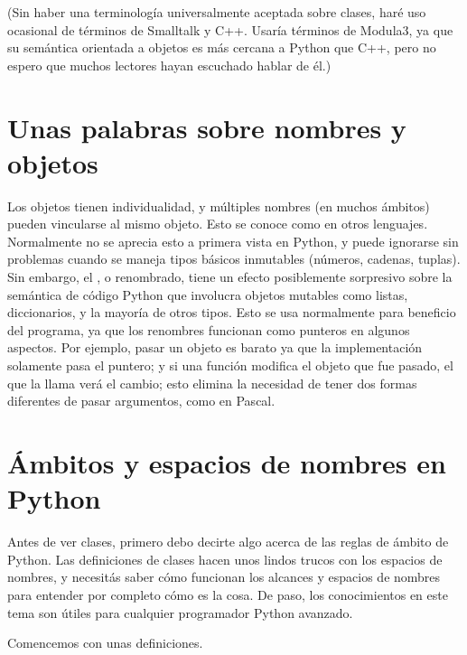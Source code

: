 \documentclass[a5paper,10pt,spanish]{sphinxmanual}
\begin{document}
\sphinxAtStartPar
(Sin haber una terminología universalmente aceptada sobre clases, haré uso ocasional de términos de Smalltalk y C++.  Usaría términos de Modula\sphinxhyphen{}3, ya que su semántica orientada a objetos es más cercana a Python que C++, pero no espero que muchos lectores hayan escuchado hablar de él.)


\section{Unas palabras sobre nombres y objetos}
\label{\detokenize{tutorial/classes:a-word-about-names-and-objects}}\label{\detokenize{tutorial/classes:tut-object}}
\sphinxAtStartPar
Los objetos tienen individualidad, y múltiples nombres (en muchos ámbitos) pueden vincularse al mismo objeto.  Esto se conoce como  en otros lenguajes.  Normalmente no se aprecia esto a primera vista en Python, y puede ignorarse sin problemas cuando se maneja tipos básicos inmutables (números, cadenas, tuplas).  Sin embargo, el , o renombrado,  tiene un efecto posiblemente sorpresivo sobre la semántica de código Python que involucra objetos mutables como listas, diccionarios, y la mayoría de otros tipos.  Esto se usa normalmente para beneficio del programa, ya que los renombres funcionan como punteros en algunos aspectos.  Por ejemplo, pasar un objeto es barato ya que la implementación solamente pasa el puntero; y si una función modifica el objeto que fue pasado, el que la llama verá el cambio; esto elimina la necesidad de tener dos formas diferentes de pasar argumentos, como en Pascal.


\section{Ámbitos y espacios de nombres en Python}
\label{\detokenize{tutorial/classes:python-scopes-and-namespaces}}\label{\detokenize{tutorial/classes:tut-scopes}}
\sphinxAtStartPar
Antes de ver clases, primero debo decirte algo acerca de las reglas de ámbito de Python.  Las definiciones de clases hacen unos lindos trucos con los espacios de nombres, y necesitás saber cómo funcionan los alcances y espacios de nombres para entender por completo cómo es la cosa.  De paso, los conocimientos en este tema son útiles para cualquier programador Python avanzado.

\sphinxAtStartPar
Comencemos con unas definiciones.
\end{document}
